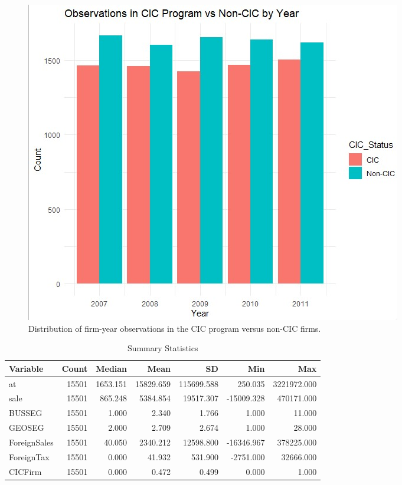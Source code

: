 \documentclass[12pt]{article}
\begin{document}
\begin{figure}[htbp]
    \centering
    \includegraphics[width=1\linewidth]{Graph.jpg}
    \caption{Distribution of firm-year observations in the CIC program versus non-CIC firms.}
    \label{fig:Dist}
\end{figure}



\begin{table}[p]
\caption{Summary Statistics}
\label{tab:Summary}
\centering
\begin{tabular}[t]{lrrrrrr}
  \hline
Variable & Count & Median & Mean & SD & Min & Max \\ 
  \hline
  at & 15501 & 1653.151 & 15829.659 & 115699.588 & 250.035 & 3221972.000 \\ 
  sale & 15501 & 865.248 & 5384.854 & 19517.307 & -15009.328 & 470171.000 \\ 
  BUSSEG & 15501 & 1.000 & 2.340 & 1.766 & 1.000 & 11.000 \\ 
  GEOSEG & 15501 & 2.000 & 2.709 & 2.674 & 1.000 & 28.000 \\ 
  ForeignSales & 15501 & 40.050 & 2340.212 & 12598.800 & -16346.967 & 378225.000 \\ 
  ForeignTax & 15501 & 0.000 & 41.932 & 531.900 & -2751.000 & 32666.000 \\ 
  CICFirm & 15501 & 0.000 & 0.472 & 0.499 & 0.000 & 1.000 \\ 
   \hline
\end{tabular}
\end{table}
\end{document}
